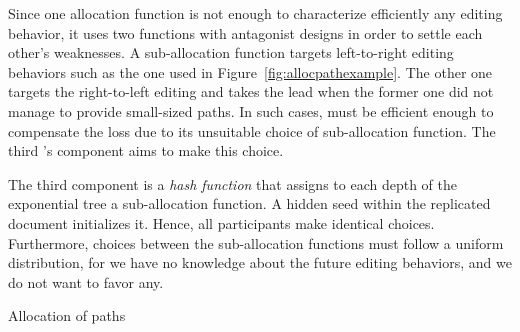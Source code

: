 Since one allocation function is not enough to characterize efficiently any
editing behavior, it uses two functions with antagonist designs in order to
settle each other's weaknesses. A sub-allocation function targets left-to-right
editing behaviors such as the one used in Figure~\ref{fig:allocpathexample}. The
other one targets the right-to-left editing and takes the lead when the former
one did not manage to provide small-sized paths. In such cases, \LSEQ must be
efficient enough to compensate the loss due to its unsuitable choice of
sub-allocation function. The third \LSEQ's component aims to make this
choice.

The third component is a \emph{hash function} that assigns to each depth of the
exponential tree a sub-allocation function.  A hidden seed within the replicated
document initializes it. Hence, all participants make identical
choices. Furthermore, choices between the sub-allocation functions must follow a
uniform distribution, for we have no knowledge about the future editing
behaviors, and we do not want to favor any.



\begin{algorithm}

\caption{\label{algo:allocpath}Allocation of paths}
\end{algorithm}

